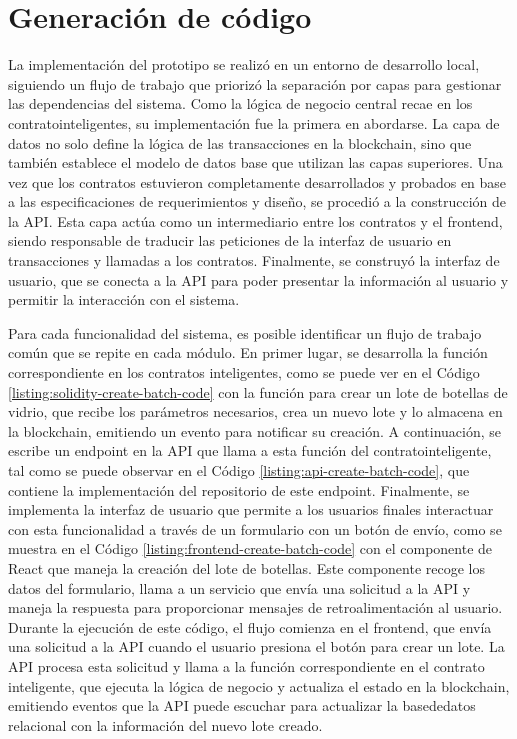 \section{Generación de código}
\label{sec:code-generation}

La implementación del prototipo se realizó en un entorno de desarrollo local, siguiendo un flujo de trabajo que priorizó la separación por capas para gestionar las dependencias del sistema. Como la lógica de negocio central recae en los \glspl{contratointeligente}, su implementación fue la primera en abordarse. La capa de datos no solo define la lógica de las transacciones en la blockchain, sino que también establece el modelo de datos base que utilizan las capas superiores. Una vez que los contratos estuvieron completamente desarrollados y probados en base a las especificaciones de requerimientos y diseño, se procedió a la construcción de la API. Esta capa actúa como un intermediario entre los contratos y el \gls{frontend}, siendo responsable de traducir las peticiones de la interfaz de usuario en transacciones y llamadas a los contratos. Finalmente, se construyó la interfaz de usuario, que se conecta a la API para poder presentar la información al usuario y permitir la interacción con el sistema.

Para cada funcionalidad del sistema, es posible identificar un flujo de trabajo común que se repite en cada módulo. En primer lugar, se desarrolla la función correspondiente en los contratos inteligentes, como se puede ver en el Código \ref{listing:solidity-create-batch-code} con la función para crear un lote de botellas de vidrio, que recibe los parámetros necesarios, crea un nuevo lote y lo almacena en la blockchain, emitiendo un evento para notificar su creación. A continuación, se escribe un \gls{endpoint} en la API que llama a esta función del \gls{contratointeligente}, tal como se puede observar en el Código \ref{listing:api-create-batch-code}, que contiene la implementación del repositorio de este endpoint. Finalmente, se implementa la interfaz de usuario que permite a los usuarios finales interactuar con esta funcionalidad a través de un formulario con un botón de envío, como se muestra en el Código \ref{listing:frontend-create-batch-code} con el componente de React que maneja la creación del lote de botellas. Este componente recoge los datos del formulario, llama a un servicio que envía una solicitud a la API y maneja la respuesta para proporcionar mensajes de retroalimentación al usuario. Durante la ejecución de este código, el flujo comienza en el frontend, que envía una solicitud a la API cuando el usuario presiona el botón para crear un lote. La API procesa esta solicitud y llama a la función correspondiente en el contrato inteligente, que ejecuta la lógica de negocio y actualiza el estado en la blockchain, emitiendo eventos que la API puede escuchar para actualizar la \gls{basededatos} relacional con la información del nuevo lote creado. 

